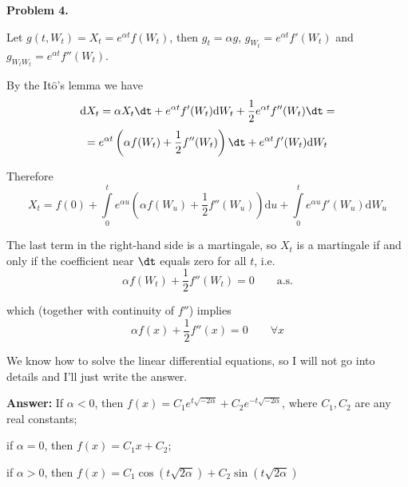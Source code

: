 \documentclass[12pt, a4paper]{article}
\newcommand{\ds}{\displaystyle}
\newcommand{\du}{\mathrm{d}u}
\begin{document}
\textbf{Problem 4.}\par
Let $g(t,W_{t}) = X_{t} = e^{\alpha t}f(W_{t})$, then $g_{t} = \alpha g$, $g_{W_{t}} = e^{\alpha t}f'(W_{t})$ and $g_{W_{t}W_{t}} = e^{\alpha t}f''(W_{t})$.\par
By the It$\hat{\mbox{o}}$'s lemma we have
$$
\mathrm{d}X_{t} = \alpha X_{t}\dt + e^{\alpha t}f'(W_{t})\mathrm{d}W_{t} + \frac{\ds 1}{\ds 2}e^{\alpha t}f''(W_{t})\dt =$$ $$= e^{\alpha t}\left(\alpha f(W_{t}) + \frac{\ds 1}{\ds 2}f''(W_{t})\right)\dt + e^{\alpha t}f'(W_{t})\mathrm{d}W_{t}
$$\par
Therefore
$$
X_{t} = f(0) + \int\limits_{0}^{t}e^{\alpha u}\left(\alpha f(W_{u}) + \frac{\ds 1}{\ds 2}f''(W_{u})\right)\du + \int\limits_{0}^{t}e^{\alpha u}f'(W_{u})\mathrm{d}W_{u}
$$
\par
The last term in the right-hand side is a martingale, so $X_{t}$ is a martingale if and only if the coefficient near $\dt$ equals zero for all $t$, i.e.
$$
\alpha f(W_{t}) + \frac{\ds 1}{\ds 2}f''(W_{t}) = 0 \qquad \mbox{a.s.}
$$\par
which (together with continuity of $f''$) implies
$$
\alpha f(x) + \frac{\ds 1}{\ds 2}f''(x) = 0\qquad \forall x
$$
\par
We know how to solve the linear differential equations, so I will not go into details and I'll just write the answer.\[\]\par
\textbf{Answer:} If $\alpha < 0$, then $f(x) = C_{1}e^{t\sqrt{-2\alpha}} + C_{2}e^{-t\sqrt{-2\alpha}}$, where $C_{1}, C_{2}$ are any real constants;\par
if $\alpha = 0$, then $f(x) = C_{1}x + C_{2}$;\par
if $\alpha > 0$, then $f(x) = C_{1}\cos(t\sqrt{2\alpha}) + C_{2}\sin(t\sqrt{2\alpha})$
\end{document}
